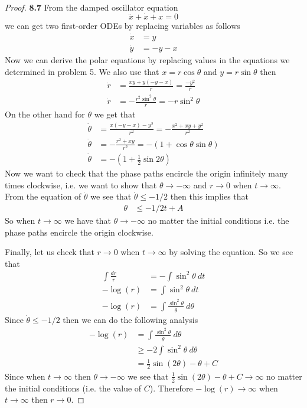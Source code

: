 \documentclass[11pt]{article}
\theoremstyle{definition}
\begin{document}
\cleardoublepage
    \begin{proof}{\textbf{8.7}}
        From the damped oscillator equation
        $$\ddot{x} + \dot{x} + x = 0$$
        we can get two first-order ODEs by replacing variables as follows
        \begin{align*}
            \dot{x} &= y\\
            \dot{y} &= -y - x
        \end{align*}
        Now we can derive the polar equations by replacing values in the
        equations we determined in problem 5. We also use that $x = r\cos\theta$
        and $y= r\sin\theta$ then
        \begin{align*}
            \dot{r} &= \frac{xy + y(-y-x)}{r} = \frac{-y^2}{r}\\
            \dot{r} &= -\frac{r^2\sin^2\theta}{r} = -r\sin^2\theta
        \end{align*}
        On the other hand for $\theta$ we get that
        \begin{align*}
            \dot{\theta} &= \frac{x(-y-x) - y^2}{r^2} = -\frac{x^2 +xy+ y^2}{r^2}\\
            \dot{\theta} &= -\frac{r^2+xy}{r^2} = -(1 + \cos\theta\sin\theta)\\
            \dot{\theta} &= -\left(1 + \frac{1}{2}\sin2\theta\right)
        \end{align*} 
        Now we want to check that the phase paths encircle the origin
        infinitely many times clockwise, i.e. we want to show that
        $\theta \to -\infty$ and $r \to 0$ when $t \to \infty$. From the
        equation of $\dot{\theta}$ we see that $\dot{\theta} \leq -1/2$ then
        this implies that
        \begin{align*}
            \theta &\leq -1/2t + A
        \end{align*}
        So when $t \to \infty$ we have that $\theta \to -\infty$ no matter the
        initial conditions i.e. the phase paths encircle the origin clockwise.
        
        Finally, let us check that $r \to 0$ when $t \to \infty$ by solving the
        equation. So we see that
        \begin{align*}
            \int \frac{dr}{r} &= - \int \sin^2\theta~dt\\
            -\log(r) &= \int \sin^2\theta~dt\\
            -\log(r) &= \int \frac{\sin^2\theta}{\dot\theta}~d\theta
        \end{align*}
        Since $\dot\theta \leq -1/2$ then we can do the following analysis
        \begin{align*}
            -\log(r) &= \int \frac{\sin^2\theta}{\dot\theta}~d\theta\\
                &\geq -2\int \sin^2\theta~d\theta\\
                &= \frac{1}{2}\sin(2\theta) - \theta + C
        \end{align*}
        Since when $t \to \infty$ then $\theta \to -\infty$ we see that 
        $\frac{1}{2}\sin(2\theta) - \theta + C \to \infty$ no matter the initial
        conditions (i.e. the value of $C$). Therefore $-\log(r) \to \infty$ when
        $t \to \infty$ then $r \to 0$.
    \end{proof}
\end{document}
